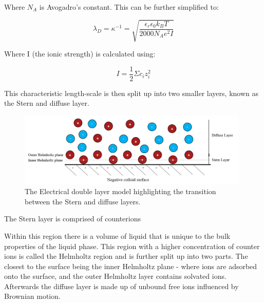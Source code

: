 Where $N_A$ is Avogadro's constant. This can be further simplified to:

\begin{equation}
 \lambda_D = \kappa^{-1} = \sqrt{ \frac{ \epsilon_r \epsilon_0 k_B T}{2000N_A e^2 I}}
\end{equation}

Where I (the ionic strength) is calculated using:

\begin{equation} 
I = \frac{1}{2} \Sigma c_i z_i^2
\end{equation}

This characteristic length-scale is then split up into two smaller layers, known as the Stern and diffuse layer.


\begin{figure}[h]     %
        \begin{center}
          \includegraphics[width=110mm]{chapter1/SternLayer.PNG}
\end{center}
\caption{The Electrical double layer model highlighting the transition between the Stern and diffuse layers.}
\label{fig:Stern}                 %
\end{figure}

The Stern layer is comprised of counterions 

Within this region there is a volume of liquid that is unique to the bulk properties of the liquid phase. This region with a higher concentration of counter ions is called the Helmholtz region and is further split up into two parts. The closest to the surface being the inner Helmholtz plane - where ions are adsorbed onto the surface, and the outer Helmholtz layer contains solvated ions. Afterwards the diffuse layer is made up of unbound free ions influenced by Brownian motion.

